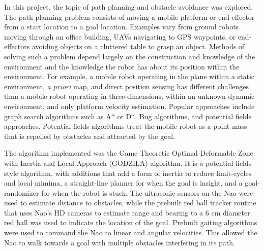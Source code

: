 In this project, the topic of path planning and obstacle avoidance was explored.
The path planning problem consists of moving a mobile platform or end-effector from a start location to a goal location.
Examples vary from ground robots moving through an office building, UAVs navigating to GPS waypoints, or end-effectors avoiding objects on a cluttered table to grasp an object.
Methods of solving such a problem depend largely on the construction and knowledge of the environment and the knowledge the robot has about its position within the environment. For example, a mobile robot operating in the plane within a static environment, \textit{a priori} map, and direct position sensing has different challenges than a mobile robot operating in three-dimensions, within an unknown dynamic environment, and only platform velocity estimation.
Popular approaches include graph search algorithms such as A* or D*, Bug algorithms, and potential fields approaches. Potential fields algorithms treat the mobile robot as a point mass that is repelled by obstacles and attracted by the goal. 

The algorithm implemented was the Game-Theoretic Optimal Deformable Zone with Inertia and Local Approach (GODZILA) algorithm. It is a potential fields style algorithm, with additions that add a form of inertia to reduce limit-cycles and local mimima, a straight-line planner for when the goal is insight, and a goal-randomizer for when the robot is stuck. The ultrasonic sensors on the Nao were used to estimate distance to obstacles, while the prebuilt red ball tracker routine that uses Nao's HD cameras to estimate range and bearing to a 6 cm diameter red ball was used to indicate the location of the goal. Prebuilt gaiting algorithms were used to command the Nao to linear and angular velocities. This allowed the Nao to walk towards a goal with multiple obstacles interfering in its path.

